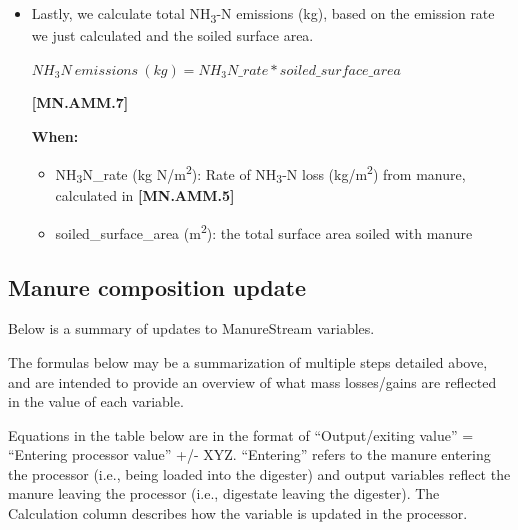 \begin{refsection}
\begin{itemize}
\begin{itemize}
    \end{itemize}

        \item Lastly, we calculate total NH\textsubscript{3}-N emissions (kg), based on the emission rate we just calculated and the soiled surface area. 
         \vspace{0.2cm}

    \begin{center}
\(NH_3N\ emissions\ (kg) = NH_3N\_rate * soiled\_surface\_area \)
    \end{center}
        \vspace{0.5cm} 
    
            {\raggedleft \textbf{[MN.AMM.7]}\par}
            \vspace{0.5cm}

\textbf{When:}
    \begin{itemize}
        \item NH\textsubscript{3}N\_rate (kg N/m\textsuperscript{2}): Rate of NH\textsubscript{3}-N loss (kg/m\textsuperscript{2}) from manure, calculated in \textbf{[MN.AMM.5]}
        \item soiled\_surface\_area (m\textsuperscript{2}): the total surface area soiled with manure

    \end{itemize}
        
    \end{itemize} 

\subsection{Manure composition update}
Below is a summary of updates to ManureStream variables. 
\vspace{0.2cm}

\begin{tcolorbox}[colback=white, colframe=black, boxrule=0.5pt, arc=3pt, width=\textwidth]
The formulas below may be a summarization of multiple steps detailed above, and are intended to provide an overview of what mass losses/gains are reflected in the value of each variable.
\end{tcolorbox}
\vspace{0.2cm}

Equations in the table below are in the format of “Output/exiting value” = “Entering processor value” +/- XYZ. “Entering” refers to the manure entering the processor (i.e., being loaded into the digester) and output variables reflect the manure leaving the processor (i.e., digestate leaving the digester). The Calculation column describes how the variable is updated in the processor.


\end{refsection}
